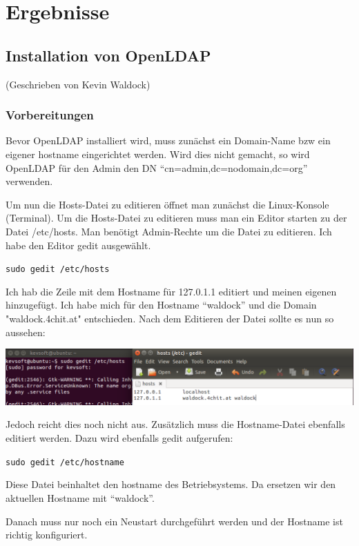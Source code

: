 
\section{Ergebnisse}
\label{sec:Ergebnisse}

\subsection{Installation von OpenLDAP}
(Geschrieben von Kevin Waldock)

\subsubsection{Vorbereitungen}
Bevor OpenLDAP installiert wird, muss zunächst ein Domain-Name bzw ein eigener hostname eingerichtet werden. Wird dies nicht gemacht, so wird OpenLDAP für den Admin den DN ``cn=admin,dc=nodomain,dc=org'' verwenden.

Um nun die Hosts-Datei zu editieren öffnet man zunächst die Linux-Konsole (Terminal). Um die Hosts-Datei zu editieren muss man ein Editor starten zu der Datei /etc/hosts. Man benötigt Admin-Rechte um die Datei zu editieren. Ich habe den Editor gedit ausgewählt.

\verb|sudo gedit /etc/hosts|

Ich hab die Zeile mit dem Hostname für 127.0.1.1 editiert und meinen eigenen hinzugefügt. Ich habe mich für den Hostname ``waldock'' und die Domain "waldock.4chit.at" entschieden. Nach dem Editieren der Datei sollte es nun so aussehen:

\begin{center}
	\includegraphics[width=1.0\linewidth]{images/a1_hostsfile.PNG}
\end{center}

Jedoch reicht dies noch nicht aus. Zusätzlich muss die Hostname-Datei ebenfalls editiert werden. Dazu wird ebenfalls gedit aufgerufen:

\verb|sudo gedit /etc/hostname|

Diese Datei beinhaltet den hostname des Betriebsystems. Da ersetzen wir den aktuellen Hostname mit ``waldock''.

Danach muss nur noch ein Neustart durchgeführt werden und der Hostname ist richtig konfiguriert.

